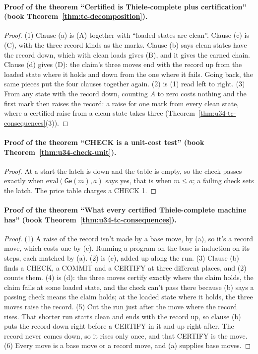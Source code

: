 \documentclass[11pt,twoside]{article}
\theoremstyle{thielethm}
\theoremstyle{thieledef}
\theoremstyle{thieledef}
\theoremstyle{thieledef}
\theoremstyle{thielethm}
\theoremstyle{thieleobs}
\theoremstyle{thielethm}
\begin{document}
\paragraph{Proof of the theorem ``Certified is Thiele-complete plus certification'' (book Theorem~\ref{thm:tc-decomposition}).}
\begin{proof}
(1) Clause (a) is (A) together with ``loaded states are clean''. Clause (c) is (C), with the three
record kinds as the marks. Clause (b) says clean states have the record down, which with clean
loads gives (B), and it gives the earned chain. Clause (d) gives (D): the claim's three moves end
with the record up from the loaded state where it holds and down from the one where it fails.
Going back, the same pieces put the four clauses together again. (2) is (1) read left to right.
(3) From any state with the record down, counting $A$ to zero costs nothing and the first mark
then raises the record: a raise for one mark from every clean state, where a certified raise from a
clean state takes three (Theorem~\ref{thm:u34-tc-consequences}(3)).
\end{proof}

\paragraph{Proof of the theorem ``CHECK is a unit-cost test'' (book Theorem~\ref{thm:u34-check-unit}).}
\begin{proof}
At a start the latch is down and the table is empty, so the check passes exactly when
$\mathrm{eval}(\mathsf{Ge}(m), a)$ says yes, that is when $m \le a$; a failing check sets the latch.
The price table charges a CHECK 1.
\end{proof}

\paragraph{Proof of the theorem ``What every certified Thiele-complete machine has'' (book Theorem~\ref{thm:u34-tc-consequences}).}
\begin{proof}
(1) A raise of the record isn't made by a base move, by (a), so it's a record move, which costs
one by (c). Running a program on the base is induction on its steps, each matched by (a).
(2) is (c), added up along the run. (3) Clause (b) finds a CHECK, a COMMIT and a CERTIFY at three
different places, and (2) counts them. (4) is (d): the three moves certify exactly where the
claim holds, the claim fails at some loaded state, and the check can't pass there because (b)
says a passing check means the claim holds; at the loaded state where it holds, the three moves
raise the record. (5) Cut the run just after the move where the record rises. That shorter run
starts clean and ends with the record up, so clause (b) puts the record down right before a
CERTIFY in it and up right after. The record never comes down, so it rises only once, and that
CERTIFY is the move.
(6) Every move is a base move or a record move, and (a) supplies base moves.
\end{proof}
\end{document}
